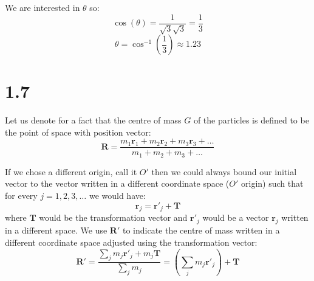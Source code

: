 \documentclass{article}
\begin{document}
We are interested in \(\theta\) so:
\begin{equation*}
    \cos(\theta) = \frac{1}{\sqrt{3}\sqrt{3}} = \frac{1}{3}
\end{equation*}
\begin{equation*}
    \theta = \cos^{-1}(\frac{1}{3}) \approx 1.23
\end{equation*}

\section*{1.7}


Let us denote for a fact that the centre of mass \(G\) of the particles is defined to be the point of space
with position vector:
\begin{equation*}
    \textbf{R} = \frac{m_{1}\textbf{r}_{1} + m_{2}\textbf{r}_{2} + m_{3}\textbf{r}_{3} + \dots}{m_1 + m_2 + m_3 + \dots}
\end{equation*}

If we chose a different origin, call it \(O'\) then we could always bound our initial vector to
the vector written in a different coordinate space (\(O'\) origin) such that for every
\(j = 1, 2, 3, \dots\) we would have:
\begin{equation*}
    \textbf{r}_j = \textbf{r}'_{j} + \textbf{T}
\end{equation*} 
where \(\textbf{T}\) would be the transformation vector and \(\textbf{r}'_{j}\) would be
a vector \(\textbf{r}_j\) written in a different space.
We use \(\textbf{R}'\) to indicate the centre of mass written in a different coordinate space
adjusted using the transformation vector:
\begin{equation*}
    \textbf{R}' = \frac{\sum_{j}m_{j}\textbf{r}'_{j} + m_{j}\textbf{T}}{\sum_{j}m_j} = (\sum_{j}m_{j}\textbf{r}'_{j}) + \textbf{T}
\end{equation*}
\end{document}
